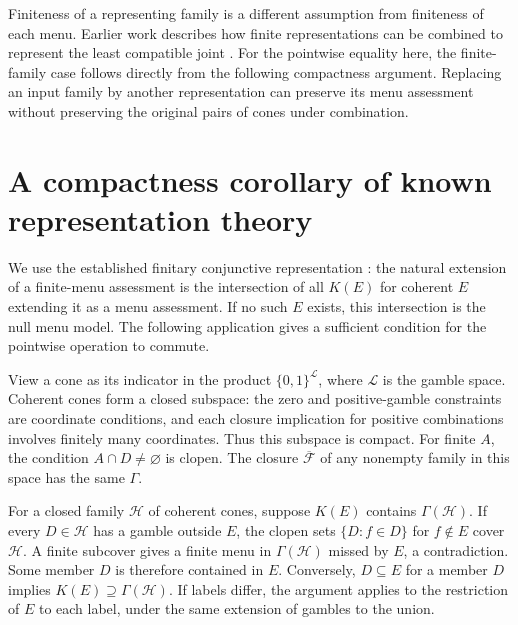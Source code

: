 \documentclass[11pt,a4paper]{amsart}
\begin{document}
Finiteness of a representing family is a different assumption
from finiteness of each menu. Earlier work describes how finite
representations can be combined to represent the least
compatible joint \cite[Props.~10--12]{marginal}. For the pointwise
equality here, the finite-family case follows directly from the
following compactness argument. Replacing an input family by
another representation can preserve its menu assessment without
preserving the original pairs of cones under combination.

\section{A compactness corollary of known representation theory}

We use the established finitary conjunctive representation
\cite[Cor.~37 and eq.~(24)]{rep}: the natural extension of a
finite-menu assessment is the intersection of all \(K(E)\)
for coherent \(E\) extending it as a menu assessment.
If no such \(E\) exists, this intersection is the null menu
model. The following application gives a sufficient condition
for the pointwise operation to commute.

View a cone as its indicator in the product
\(\{0,1\}^{\mathcal L}\), where \(\mathcal L\) is the gamble space.
Coherent cones form a closed subspace: the zero and positive-gamble
constraints are coordinate conditions, and each closure implication
for positive combinations involves finitely many coordinates.
Thus this subspace is compact. For finite \(A\), the condition
\(A\cap D\ne\varnothing\) is clopen. The closure \(\overline{\mathcal F}\)
of any nonempty family in this space has the same \(\Gamma\).

For a closed family \(\mathcal H\) of coherent cones, suppose
\(K(E)\) contains \(\Gamma(\mathcal H)\).
If every \(D\in\mathcal H\) has a gamble outside \(E\), the clopen
sets \(\{D:f\in D\}\) for \(f\notin E\) cover \(\mathcal H\).
A finite subcover gives a finite menu in \(\Gamma(\mathcal H)\)
missed by \(E\), a contradiction. Some member \(D\) is therefore
contained in \(E\). Conversely, \(D\subseteq E\) for a member \(D\)
implies \(K(E)\supseteq\Gamma(\mathcal H)\).
If labels differ, the argument applies to the restriction of \(E\)
to each label, under the same extension of gambles to the union.
\end{document}
